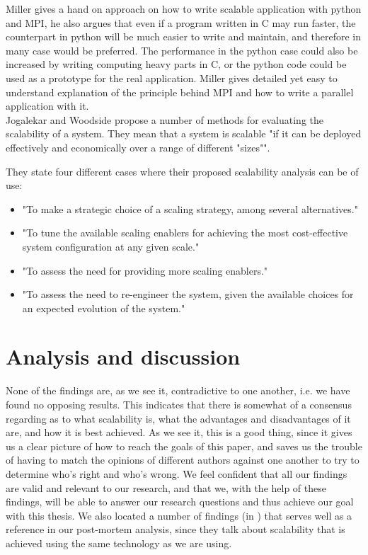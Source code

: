 \documentclass{article}
\begin{document}
{Miller \cite{millerparallel}\cite{miller2002pympi} gives a hand on approach on
how to write scalable application with python and MPI, he also argues that
even if a program written in C may run faster, the counterpart in python will
be much easier to write and maintain, and therefore in many case would be
preferred. The performance in the python case could also be increased by
writing computing heavy parts in C, or the python code could be used as a 
prototype for the real application. Miller gives detailed yet easy to 
understand explanation of the principle behind MPI and how to write a
parallel application with it.
\\
 
Jogalekar and Woodside \cite{jogalekar2000evaluating} propose a number of
methods for evaluating the scalability of a system. They mean that a system is
scalable "if it can be deployed effectively and economically over a range of
different "sizes"". 

They state four different cases where their proposed scalability analysis can
be of use:
\begin{itemize}
\item{"To make a strategic choice of a scaling strategy, among several
alternatives."}
\item{"To tune the available scaling enablers for achieving the most
cost-effective system configuration at any given scale."}
\item{"To assess the need for providing more scaling enablers."}
\item{"To assess the need to re-engineer the system, given the available choices
for an expected evolution of the system."}
\end{itemize}


\section{Analysis and discussion}

None of the findings are, as we see it, contradictive to one another, i.e. we
have found no opposing results.  This indicates that there is somewhat of a
consensus regarding as to what scalability is, what the advantages and
disadvantages of it are, and how it is best achieved. As we see it, this is a
good thing, since it gives us a clear picture of how to reach the goals of this
paper, and saves us the trouble of having to match the opinions of different
authors against one another to try to determine who's right and who's wrong.
We feel confident that all our findings are valid and relevant to our research,
and that we, with the help of these findings, will be able to answer our
research questions and thus achieve our goal with this thesis.
We also located a number of findings
(in \cite{gropp1996high}\cite{miller2002pympi}\cite{millerparallel}) that
serves well as a reference in our post-mortem analysis, since they talk about
scalability that is achieved using the same technology as we are using.
\\

}
\end{document}
